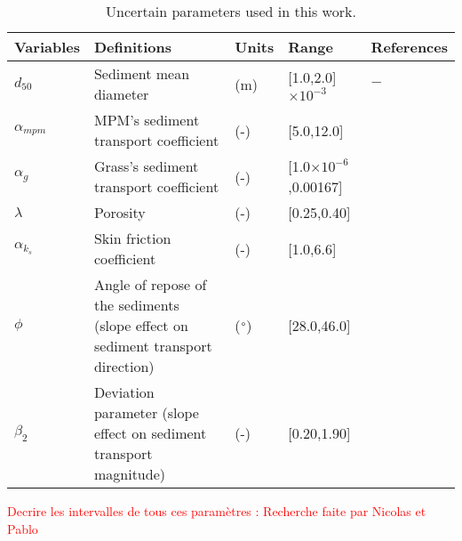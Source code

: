 \vspace{0.5cm}
\begin{table}[!h]
\centering
\begin{tabular}{|L{1.25cm}|L{4.0cm}|C{0.75cm}|L{3cm}|L{2cm}|}
  \hline
  \hline
  Variables & Definitions & Units & Range & References\\
  \hline
\hline $d_{50}$ & Sediment mean diameter & (m) & [1.0,2.0]$\times 10^{-3}$ & $-$\\
\hline $\alpha_{mpm}$ & MPM's sediment transport coefficient & (-) & [5.0,12.0] & \cite{doi:10.1061/(ASCE)0733-9429(2002)128:12(1060),nielsen1992coastal}\\
\hline $\alpha_g$ & Grass's sediment transport coefficient & (-) & [1.0$\times 10^{-6}$,0.00167] & \cite{MURILLO20108704,SIVIGLIA2013243}\\
\hline $\lambda$ & Porosity & (-) & [0.25,0.40] & \cite{doi:10.1061/9780784408148}\\
\hline $\alpha_{k_s}$ & Skin friction coefficient & (-) & [1.0,6.6] & \cite{Keulegan38,SED:SED51}\\
\hline $\phi$ & Angle of repose of the sediments (slope effect on sediment transport direction) & ($\degree$) & [28.0,46.0] & \cite{Vulliet16}\\
\hline $\beta_2$ & Deviation parameter (slope effect on sediment transport magnitude) & (-) & [0.20,1.90] & \cite{Yossef2016river,talmon1995laboratory}\\
\hline
\hline
\end{tabular}
\caption{Uncertain parameters used in this work.}\label{tab:variables}
\end{table}

\textcolor{red}{Decrire les intervalles de tous ces paramètres : Recherche faite par Nicolas et Pablo}



